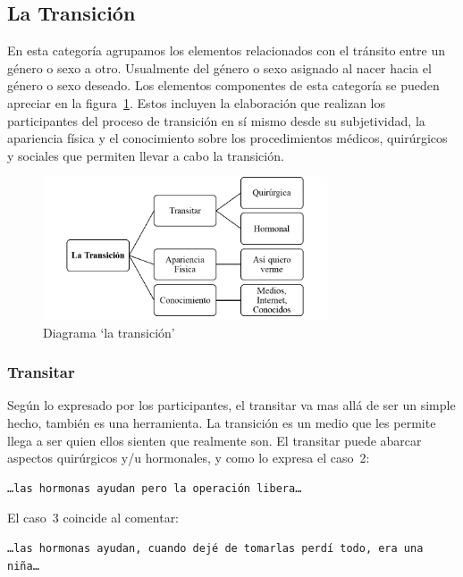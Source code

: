 \subsection{La Transición}

En esta categoría agrupamos los elementos relacionados con el tránsito entre un
género o sexo a otro. Usualmente del género o sexo asignado al nacer hacia el
género o sexo deseado. Los elementos componentes de esta categoría se pueden
apreciar en la figura~\ref{fig:transicion}. Estos incluyen la elaboración que
realizan los participantes del proceso de transición en sí mismo desde su
subjetividad, la apariencia física y el conocimiento sobre los procedimientos
médicos, quirúrgicos y sociales que permiten llevar a cabo la transición.

\begin{figure}
    \centering
    \includegraphics[width=0.75\textwidth]{transicion}
    \caption{Diagrama ‘la transición’}\label{fig:transicion}
\end{figure}

\subsubsection{Transitar}

Según lo expresado por los participantes, el transitar va mas allá de ser un
simple hecho, también es una herramienta. La transición es un medio que
les permite llega a ser quien ellos sienten que realmente son. El transitar
puede abarcar aspectos quirúrgicos y/u hormonales, y como lo expresa el caso~2:

\begin{verbatim}
…las hormonas ayudan pero la operación libera…
\end{verbatim}

El caso~3 coincide al comentar:

\begin{verbatim}
…las hormonas ayudan, cuando dejé de tomarlas perdí todo, era una niña…
\end{verbatim}

